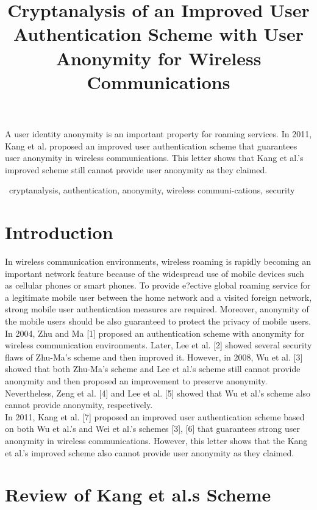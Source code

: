\documentclass[letter]{ieice}%
\title[How to Use the Class File (\ClassFile)]
      {Cryptanalysis of an Improved User Authentication Scheme with User Anonymity for Wireless Communications}
\begin{document}
\maketitle

\begin{summary}
 A user identity anonymity is an important property for roaming services. In 2011, Kang et al. proposed an improved user authentication scheme that guarantees user anonymity in wireless communications. This letter shows that Kang et al.'s improved scheme still cannot provide user anonymity as they claimed.
\end{summary}
\begin{keywords}
\LaTeXe\ cryptanalysis, authentication, anonymity, wireless communi-cations, security
\end{keywords}

\section{Introduction}\label{intro}

In wireless communication environments, wireless roaming is rapidly becoming an important network feature because of the widespread use of mobile devices such as cellular phones or smart phones. To provide e?ective global roaming service for a legitimate mobile user between the home network and a visited foreign network, strong mobile user authentication measures are required. Moreover, anonymity of the mobile users should be also guaranteed to protect the privacy of mobile users.
\indent In 2004, Zhu and Ma [1] proposed an authentication scheme with anonymity for wireless communication environments. Later, Lee et al. [2] showed several security flaws of Zhu-Ma’s scheme and then improved it. However, in 2008, Wu et al. [3] showed that both Zhu-Ma’s scheme and Lee et al.’s scheme still cannot provide anonymity and then proposed an improvement to preserve anonymity. Nevertheless, Zeng et al. [4] and Lee et al. [5] showed that Wu et al.’s scheme also cannot provide anonymity, respectively.\\
\indent In 2011, Kang et al. [7] proposed an improved user authentication scheme based on both Wu et al.’s and Wei et al.’s schemes [3], [6] that guarantees strong user anonymity in wireless communications. However, this letter shows that the Kang et al.’s improved scheme also cannot provide user anonymity as they claimed.
\section{Review of Kang et al.s Scheme}
\label{usage}
\end{document}
